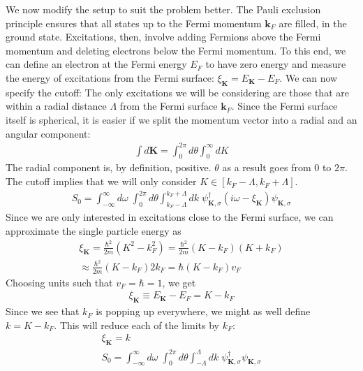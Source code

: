 \documentclass{article}
\begin{document}
\begin{minipage}{0.55\textwidth}
We now modify the setup to suit the problem better. The Pauli exclusion principle ensures that all states up to the Fermi momentum \(\mathbf{k}_F\) are filled, in the ground state. Excitations, then, involve adding Fermions above the Fermi momentum and deleting electrons below the Fermi momentum. To this end, we can define an electron at the Fermi energy \(E_F\) to have zero energy and measure the energy of excitations from the Fermi surface: \(\xi_{\mathbf K} = E_{\mathbf K} - E_F\).
We can now specify the cutoff: The only excitations we will be considering are those that are within a radial distance \(\Lambda\) from the Fermi surface \(\mathbf{k}_F\). Since the Fermi surface itself is spherical, it is easier if we split the momentum vector into a radial and an angular component:
\begin{equation}\begin{aligned}
\int d\mathbf{K} = \int_0^{2\pi} d\theta \int_0^\infty dK
\end{aligned}\end{equation}
The radial component is, by definition, positive. \(\theta\) as a result goes from \(0\) to \(2\pi\). The cutoff implies that we will only consider \(K \in \left[k_F - \Lambda, k_F + \Lambda\right]\).
\begin{equation}\begin{aligned}
	S_0 = \int_{-\infty}^\infty d\omega\;\int_0^{2\pi} d\theta \int_{k_F - \Lambda}^{k_F + \Lambda}  dk\; \psi_{\mathbf{K},\sigma}^\dagger \left(i\omega - \xi_{\mathbf{K}}\right)\psi_{\mathbf{K},\sigma}
\end{aligned}\end{equation}
Since we are only interested in excitations close to the Fermi surface, we can approximate the single particle energy as
\begin{equation}\begin{aligned}
	\xi_\mathbf{K} = \frac{\hbar^2}{2m}\left(K^2 - k_F^2\right) = \frac{\hbar^2}{2m}\left(K - k_F\right)\left(K + k_F\right) \\
	\approx \frac{\hbar^2}{2m}\left(K - k_F\right)2k_F = \hbar \left(K-k_F\right)v_F
\end{aligned}\end{equation}
Choosing units such that \(v_F = \hbar = 1\), we get
\begin{equation}\begin{aligned}
	\xi_\mathbf{K} \equiv E_\mathbf{K} - E_F = K - k_F
\end{aligned}\end{equation}
Since we see that \(k_F\) is popping up everywhere, we might as well define \(k = K - k_F\). This will reduce each of the limits by \(k_F\):
\begin{gather}
	\xi_\mathbf{K} = k \\
	S_0 = \int_{-\infty}^\infty d\omega\;\int_0^{2\pi} d\theta \int_{- \Lambda}^{\Lambda}  dk\; \psi_{\mathbf{K},\sigma}^\dagger \psi_{\mathbf{K},\sigma}\label{action}
\end{gather}
\end{minipage}
\end{document}
